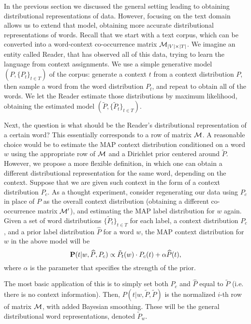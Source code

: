 In the previous section we discussed the general setting leading to
obtaining distributional representations of data. However, focusing on
the text domain allows us to extend that model, obtaining more
accurate distributional representations of words. Recall that we start
with a text corpus, which can be converted into a word-context
co-occurrence matrix ${\mathcal M}_{|V|\times|T|}$. 
We imagine an entity
called Reader, that has observed all of this data, trying to learn the
language from context assignments.
We use a simple generative model $(P,\{P_t\}_{t\in T})$ of the corpus: 
generate a context $t$ from a context distribution $P$, then sample a
word from the word distribution $P_t$,
and repeat to obtain all of the words. We let the Reader estimate
those distributions by maximum likelihood, obtaining the estimated
model $(\tilde{P},\{\tilde{P}_t\}_{t\in T})$.

Next, the question is what should be  
the Reader's distributional representation of a certain word? This
essentially corresponds to a row of matrix ${\mathcal M}$. A reasonable choice
would be to estimate the MAP context distribution conditioned on a word
$w$ using the appropriate row of ${\mathcal M}$ and a Dirichlet prior centered
around $\tilde{P}$. However, we propose
a more flexible definition, in which one can obtain a different
distributional representation for the same word, depending on the
context. Suppose that we are given such context in the form of a context
distribution $P_c$. As a thought experiment, consider regenerating our
data using $P_c$ in place of $P$ as the overall context
distribution (obtaining a different co-occurrence matrix ${\mathcal M}'$), and
estimating the MAP label distribution for $w$ again.
\bep\label{map}
Given a set of word distributions $\{\tilde{P}_t\}_{t\in T}$ for each label, a context
distribution $P_c$, and a prior label distribution $\widehat{P}$ for a word $w$,
the MAP context distribution for $w$ in the above model will be
\[\operatorname{\mathbf{P}}(t|w,\widehat{P},P_c) \propto \tilde{P}_t(w)\cdot P_c(t) + \alpha
\widehat{P}(t),\]
where $\alpha$ is the parameter that specifies the strength of the prior.
\eep

The most basic application of this is to simply set
both $P_c$ and $\widehat{P}$ equal to $\tilde{P}$ (i.e. there is no context
information). Then, $P(t|w,\tilde{P},\tilde{P})$ is the
normalized $i$-th row of matrix ${\mathcal M}$, with added Bayesian
smoothing. These will be the general distributional word
representations, denoted $\tilde{P}_w$. 

